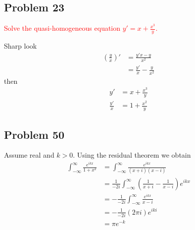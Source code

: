 \documentclass[10pt,a4paper]{book}
\theoremstyle{definition}
\begin{document}
\subsection{Problem 23}
\textcolor{red}{Solve the quasi-homogeneous equation $y'=x+\frac{x^3}{y}$.}

Sharp look
\begin{align}
\left(\frac{y}{x}\right)'
&=\frac{y'x-y}{x^2}\\
&=\frac{y'}{x}-\frac{y}{x^2}
\end{align}
then
\begin{align}
y'&=x+\frac{x^3}{y}\\
\frac{y'}{x}&=1+\frac{x^2}{y}
\end{align}

\subsection{Problem 50}
Assume real and $k>0$. Using the residual theorem we obtain
\begin{align}
\int_{-\infty}^\infty\frac{e^{ikx}}{1+x^2}
&=\int_{-\infty}^\infty\frac{e^{ikx}}{(x+i)(x-i)}\\
&=\frac{1}{-2i}\int_{-\infty}^\infty\left(\frac{1}{x+i}-\frac{1}{x-i}\right)e^{ikx}\\
&=-\frac{1}{-2i}\int_{-\infty}^\infty\frac{e^{ikx}}{x-i}\\
&=-\frac{1}{-2i}(2\pi i) e^{iki}\\
&=\pi e^{-k}
\end{align}
\end{document}
